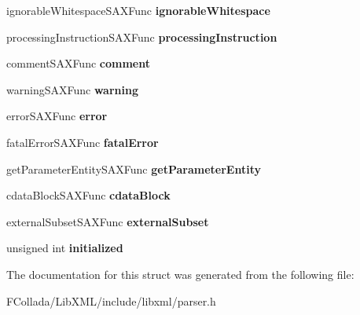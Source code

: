 \begin{DoxyCompactItemize}
\item 
\hypertarget{struct__xmlSAXHandlerV1_a0d25157139fc3e99e67f0a126dee5d5c}{
ignorableWhitespaceSAXFunc {\bfseries ignorableWhitespace}}
\label{struct__xmlSAXHandlerV1_a0d25157139fc3e99e67f0a126dee5d5c}

\item 
\hypertarget{struct__xmlSAXHandlerV1_a2d98ad46baa0f1a03ccca433e7541f65}{
processingInstructionSAXFunc {\bfseries processingInstruction}}
\label{struct__xmlSAXHandlerV1_a2d98ad46baa0f1a03ccca433e7541f65}

\item 
\hypertarget{struct__xmlSAXHandlerV1_a0100dbc90526989b6ef1786d27253f3e}{
commentSAXFunc {\bfseries comment}}
\label{struct__xmlSAXHandlerV1_a0100dbc90526989b6ef1786d27253f3e}

\item 
\hypertarget{struct__xmlSAXHandlerV1_abd9b23cf8beef529266afe74e9e82dbf}{
warningSAXFunc {\bfseries warning}}
\label{struct__xmlSAXHandlerV1_abd9b23cf8beef529266afe74e9e82dbf}

\item 
\hypertarget{struct__xmlSAXHandlerV1_a944f9de403a5740bf219129523e49130}{
errorSAXFunc {\bfseries error}}
\label{struct__xmlSAXHandlerV1_a944f9de403a5740bf219129523e49130}

\item 
\hypertarget{struct__xmlSAXHandlerV1_a5b6797dbc24c30062a216c8d9da10ce8}{
fatalErrorSAXFunc {\bfseries fatalError}}
\label{struct__xmlSAXHandlerV1_a5b6797dbc24c30062a216c8d9da10ce8}

\item 
\hypertarget{struct__xmlSAXHandlerV1_a3fa7627b54df41f9b7c4ffc56acf5093}{
getParameterEntitySAXFunc {\bfseries getParameterEntity}}
\label{struct__xmlSAXHandlerV1_a3fa7627b54df41f9b7c4ffc56acf5093}

\item 
\hypertarget{struct__xmlSAXHandlerV1_a98acb685255099ea411bec6ba59aa3b1}{
cdataBlockSAXFunc {\bfseries cdataBlock}}
\label{struct__xmlSAXHandlerV1_a98acb685255099ea411bec6ba59aa3b1}

\item 
\hypertarget{struct__xmlSAXHandlerV1_abed7b7b3c670bd6dceeffaf9ed7ea91d}{
externalSubsetSAXFunc {\bfseries externalSubset}}
\label{struct__xmlSAXHandlerV1_abed7b7b3c670bd6dceeffaf9ed7ea91d}

\item 
\hypertarget{struct__xmlSAXHandlerV1_aeed93655a47b1ea5c82a540b5843fa79}{
unsigned int {\bfseries initialized}}
\label{struct__xmlSAXHandlerV1_aeed93655a47b1ea5c82a540b5843fa79}

\end{DoxyCompactItemize}


The documentation for this struct was generated from the following file:\begin{DoxyCompactItemize}
\item 
FCollada/LibXML/include/libxml/parser.h\end{DoxyCompactItemize}
